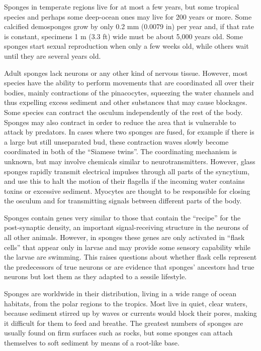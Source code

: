 Sponges in temperate regions live for at most a few years, but some tropical species and perhaps some deep-ocean ones may live for 200 years or more. Some calcified demosponges grow by only 0.2 mm (0.0079 in) per year and, if that rate is constant, specimens 1 m (3.3 ft) wide must be about 5,000 years old. Some sponges start sexual reproduction when only a few weeks old, while others wait until they are several years old.

Adult sponges lack neurons or any other kind of nervous tissue. However, most species have the ability to perform movements that are coordinated all over their bodies, mainly contractions of the pinacocytes, squeezing the water channels and thus expelling excess sediment and other substances that may cause blockages. Some species can contract the osculum independently of the rest of the body. Sponges may also contract in order to reduce the area that is vulnerable to attack by predators. In cases where two sponges are fused, for example if there is a large but still unseparated bud, these contraction waves slowly become coordinated in both of the ``Siamese twins''. The coordinating mechanism is unknown, but may involve chemicals similar to neurotransmitters. However, glass sponges rapidly transmit electrical impulses through all parts of the syncytium, and use this to halt the motion of their flagella if the incoming water contains toxins or excessive sediment. Myocytes are thought to be responsible for closing the osculum and for transmitting signals between different parts of the body.

Sponges contain genes very similar to those that contain the ``recipe'' for the post-synaptic density, an important signal-receiving structure in the neurons of all other animals. However, in sponges these genes are only activated in ``flask cells'' that appear only in larvae and may provide some sensory capability while the larvae are swimming. This raises questions about whether flask cells represent the predecessors of true neurons or are evidence that sponges' ancestors had true neurons but lost them as they adapted to a sessile lifestyle.

Sponges are worldwide in their distribution, living in a wide range of ocean habitats, from the polar regions to the tropics. Most live in quiet, clear waters, because sediment stirred up by waves or currents would block their pores, making it difficult for them to feed and breathe. The greatest numbers of sponges are usually found on firm surfaces such as rocks, but some sponges can attach themselves to soft sediment by means of a root-like base.

